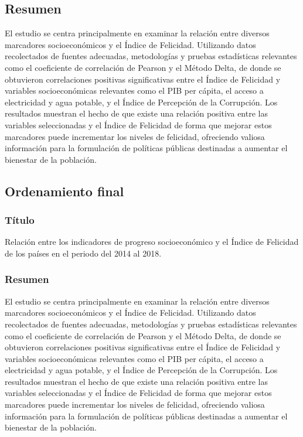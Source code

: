 \pagebreak
\subsection{Resumen}

El estudio se centra principalmente en examinar la relación entre diversos marcadores socioeconómicos y el Índice de Felicidad. Utilizando datos recolectados de fuentes adecuadas, metodologías y pruebas estadísticas relevantes como el coeficiente de correlación de Pearson y el Método Delta, de donde se obtuvieron correlaciones positivas significativas entre el Índice de Felicidad y variables socioeconómicas relevantes como el PIB per cápita, el acceso a electricidad y agua potable, y el Índice de Percepción de la Corrupción. Los resultados muestran el hecho de que existe una relación positiva entre las variables seleccionadas y el Índice de Felicidad de forma que mejorar estos marcadores puede incrementar los niveles de felicidad, ofreciendo valiosa información para la formulación de políticas públicas destinadas a aumentar el bienestar de la población.
\pagebreak

\subsection{Ordenamiento final}

\subsubsection{Título}
Relación entre los indicadores de progreso socioeconómico y el Índice de Felicidad de los países en el periodo del 2014 al 2018.

\subsubsection{Resumen}
El estudio se centra principalmente en examinar la relación entre diversos marcadores socioeconómicos y el Índice de Felicidad. Utilizando datos recolectados de fuentes adecuadas, metodologías y pruebas estadísticas relevantes como el coeficiente de correlación de Pearson y el Método Delta, de donde se obtuvieron correlaciones positivas significativas entre el Índice de Felicidad y variables socioeconómicas relevantes como el PIB per cápita, el acceso a electricidad y agua potable, y el Índice de Percepción de la Corrupción. Los resultados muestran el hecho de que existe una relación positiva entre las variables seleccionadas y el Índice de Felicidad de forma que mejorar estos marcadores puede incrementar los niveles de felicidad, ofreciendo valiosa información para la formulación de políticas públicas destinadas a aumentar el bienestar de la población.


